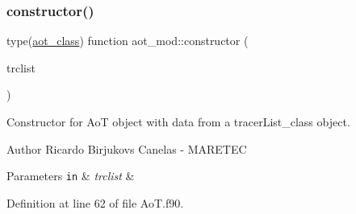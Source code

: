 \subsubsection{\texorpdfstring{constructor()}{constructor()}}
{\footnotesize\ttfamily type(\mbox{\hyperlink{structaot__mod_1_1aot__class}{aot\+\_\+class}}) function aot\+\_\+mod\+::constructor (\begin{DoxyParamCaption}\item[{class(\mbox{\hyperlink{structtracer__list__mod_1_1tracerlist__class}{tracerlist\+\_\+class}}), intent(in)}]{trclist }\end{DoxyParamCaption})\hspace{0.3cm}{\ttfamily [private]}}



Constructor for AoT object with data from a tracer\+List\+\_\+class object. 

\begin{DoxyAuthor}{Author}
Ricardo Birjukovs Canelas -\/ M\+A\+R\+E\+T\+EC 
\end{DoxyAuthor}

\begin{DoxyParams}[1]{Parameters}
\mbox{\tt in}  & {\em trclist} & \\
\hline
\end{DoxyParams}


Definition at line 62 of file Ao\+T.\+f90.


